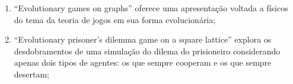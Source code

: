 \begin{enumerate}
    \item ``Evolutionary games on graphs'' oferece uma apresentação voltada a físicos do tema da teoria de jogos em sua forma evolucionária;%
    \item ``Evolutionary prisoner’s dilemma game on a square lattice'' explora os desdobramentos de uma simulação do dilema do prisioneiro considerando apenas dois tipos de agentes: os que sempre cooperam e os que sempre desertam;%

\end{enumerate}
